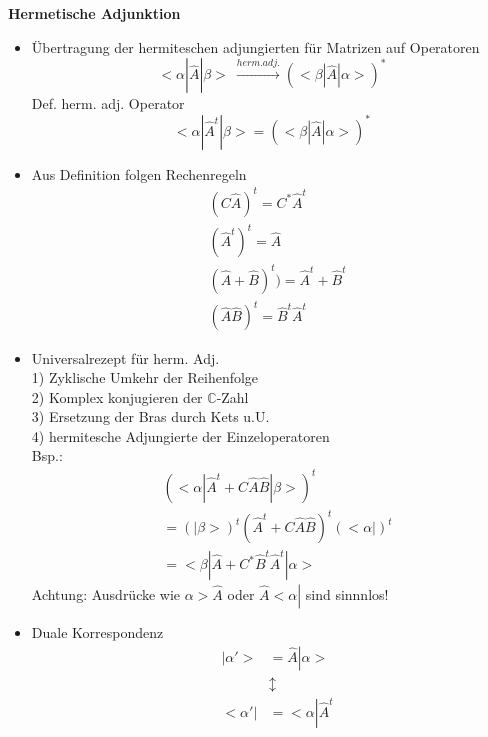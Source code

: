 \documentclass[10pt,article,colorback,accentcolor=tud9d]{scrartcl}
\begin{document}
\textbf{Hermetische Adjunktion}
\begin{fleqn}
\begin{itemize}
\item Übertragung der hermiteschen adjungierten für Matrizen auf Operatoren
  \begin{equation}
  <\alpha\left|\right.\hat{A}\left|\right.\beta> \ \xrightarrow{herm. adj.} (<\beta \left|\right.\hat{A}\left|\right.\alpha>)^*
  \end{equation}
  Def. herm. adj. Operator
  \begin{equation}
  <\alpha\left|\right.{\hat{A}}^t \left|\right. \beta>=(<\beta\left|\right.\hat{A}\left|\right.\alpha>)^*
  \end{equation}
\item Aus Definition folgen Rechenregeln
  \begin{equation}
  \begin{aligned}
  &(C\hat{A})^t=C^*{\hat{A}}^t\\
  &({\hat{A}}^t)^t=\hat{A}\\
  &(\hat{A} + \hat{B})^t )= \hat{A}^t + \hat{B}^t\\
  &(\hat{A}\hat{B})^t=\hat{B}^t\hat{A}^t
  \end{aligned}
  \end{equation}
\item Universalrezept für herm. Adj.\\
  1) Zyklische Umkehr der Reihenfolge\\
  2) Komplex konjugieren der $\mathbb{C}$-Zahl\\
  3) Ersetzung der Bras durch Kets u.U.\\
  4) hermitesche Adjungierte der Einzeloperatoren\\
  Bsp.:
  \begin{equation}
  \begin{aligned}
  &(<\alpha\left|\right.\hat{A}^t+C\hat{A}\hat{B}\left|\right.\beta>)^t\\
  &= (\left|\right.\beta>)^t (\hat{A}^t+C\hat{A}\hat{B})^t(<\alpha\left|\right.)^t\\
  &= <\beta\left|\right. \hat{A} +C^*\hat{B}^t \hat{A}^t \left|\right.\alpha>
  \end{aligned}
  \end{equation}
  Achtung: Ausdrücke wie $\alpha>\hat{A}$ oder $ \hat{A}<\alpha\left|\right.$ sind sinnnlos!
\item Duale Korrespondenz
  \begin{equation}
  \begin{aligned}
  &\left|\right.\alpha'>&=\hat{A}\left|\right.\alpha>\\
  & &\updownarrow \\
  &<\alpha'\left|\right.&=<\alpha\left|\right.\hat{A}^t
  \end{aligned}
  \end{equation}
\end{itemize}
\end{fleqn}
\end{document}
